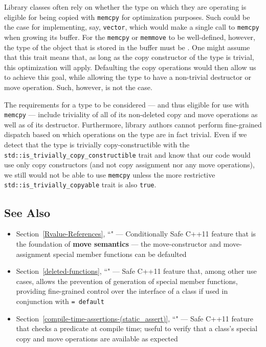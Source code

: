 {Library classes often rely on whether the type on which they are operating is eligible for being copied with \lstinline!memcpy! for optimization purposes.  Such could be the case for implementing, say, \lstinline!vector!, which would make a single call to \lstinline!memcpy! when growing its buffer.  For the \lstinline!memcpy! or \lstinline!memmove! to be well-defined, however, the type of the object that is stored in the buffer must be .  One might assume that this trait means that, as long as the copy constructor of the type is trivial, this optimization will apply.  Defaulting the copy operations would then allow us to achieve this goal, while allowing the type to have a non-trivial destructor or move operation.  Such, however, is not the case.

The requirements for a type to be considered  --- and thus eligible for use with \lstinline!memcpy! --- include triviality of all of its non-deleted copy and move operations as well as of its destructor.  Furthermore, library authors cannot perform fine-grained dispatch based on which operations on the type are in fact trivial.  Even if we detect that the type is trivially copy-constructible with the \lstinline!std::is_trivially_copy_constructible! trait and know that our code would use only copy constructors (and not copy assignment nor any move operations), we still would not be able to use \lstinline!memcpy! unless the more restrictive \lstinline!std::is_trivially_copyable! trait is also \lstinline!true!.

\subsection[See Also]{See Also}\label{see-also}

\begin{itemize}
\item{Section~\ref{Rvalue-References}, ``" — Conditionally Safe C++11 feature that is the foundation of \textbf{move semantics} — the move-constructor and move-assignment special member functions can be defaulted}
\item{Section~\ref{deleted-functions}, ``" — Safe C++11 feature that, among other use cases, allows the prevention of generation of special member functions, providing fine-grained control over the interface of a class if used in conjunction with \texttt{=}~\texttt{default}}
\item{Section~\ref{compile-time-assertions-(static_assert)}, ``" — Safe C++11 feature that checks a predicate at compile time; useful to verify that a class’s special copy and move operations are available as expected}
\end{itemize}

}
